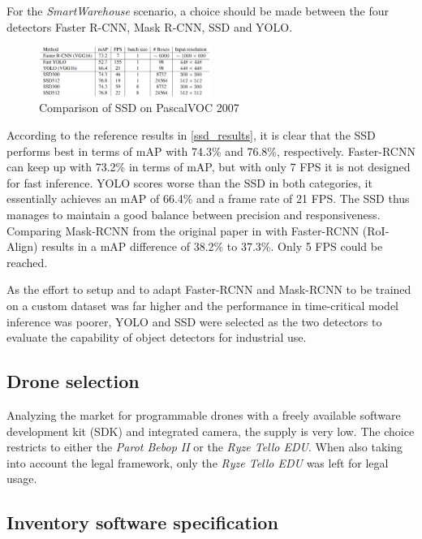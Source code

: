 \documentclass[a4paper, 10pt, journal]{wissarbIEEE}      %
\begin{document}
For the \textit{SmartWarehouse} scenario, a choice should be made between the four detectors Faster R-CNN, Mask R-CNN, SSD and YOLO. 

\begin{figure}[h]
	\centering
	\includegraphics[width=0.5\textwidth]{fig/ssd_results.png}
	\caption{Comparison of SSD on PascalVOC 2007 \cite{WeiLiuDragomirAnguelovDumitruErhanChristianSzegedyScottReedChengYangFuAlexander.2016}}
	\label{ssd_results}
\end{figure}

According to the reference results in \autoref{ssd_results}, it is clear that the SSD performs best in terms of mAP with 74.3\% and 76.8\%, respectively. Faster-RCNN can keep up with 73.2\% in terms of mAP, but with only 7 FPS it is not designed for fast inference. YOLO scores worse than the SSD in both categories, it essentially achieves an mAP of 66.4\% and a frame rate of 21 FPS. The SSD thus manages to maintain a good balance between precision and responsiveness. Comparing Mask-RCNN from the original paper in \cite{KaimingHeGeorgiaGkioxariPiotrDollarRossGirshick.2018} with Faster-RCNN (RoI-Align) results in a mAP difference of 38.2\% to 37.3\%. Only 5 FPS could be reached. 

As the effort to setup and to adapt Faster-RCNN and Mask-RCNN to be trained on a custom dataset was far higher and the performance in time-critical model inference was poorer, YOLO and SSD were selected as the two detectors to evaluate the capability of object detectors for industrial use.

\subsection{Drone selection}

Analyzing the market for programmable drones with a freely available software development kit (SDK) and integrated camera, the supply is very low. The choice restricts to either the \textit{Parot Bebop II} or the \textit{Ryze Tello EDU}. When also taking into account the legal framework, only the \textit{Ryze Tello EDU} was left for legal usage.

\subsection{Inventory software specification}
\end{document}
